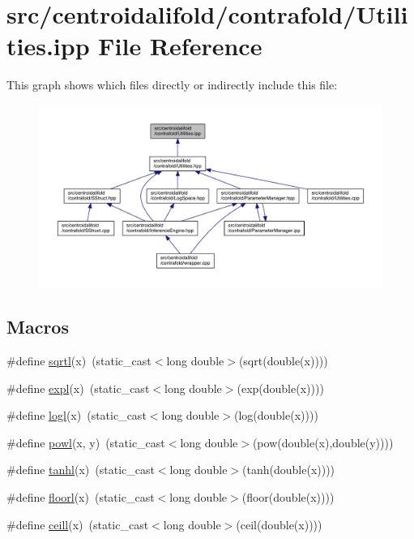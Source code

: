 \hypertarget{centroidalifold_2contrafold_2_utilities_8ipp}{\section{src/centroidalifold/contrafold/\+Utilities.ipp File Reference}
\label{centroidalifold_2contrafold_2_utilities_8ipp}
}
This graph shows which files directly or indirectly include this file\+:
\nopagebreak
\begin{figure}[H]
\begin{center}
\leavevmode
\includegraphics[width=350pt]{centroidalifold_2contrafold_2_utilities_8ipp__dep__incl}
\end{center}
\end{figure}
\subsection*{Macros}
\begin{DoxyCompactItemize}
\item 
\#define \hyperlink{centroidalifold_2contrafold_2_utilities_8ipp_adec5708ea4f27b718663e2a57e73303a}{sqrtl}(x)~(static\+\_\+cast$<$long double$>$(sqrt(double(x))))
\item 
\#define \hyperlink{centroidalifold_2contrafold_2_utilities_8ipp_a3262d247d0e746116959ee487aed42e1}{expl}(x)~(static\+\_\+cast$<$long double$>$(exp(double(x))))
\item 
\#define \hyperlink{centroidalifold_2contrafold_2_utilities_8ipp_af30ed28c10eaaab05f92d1043d458741}{logl}(x)~(static\+\_\+cast$<$long double$>$(log(double(x))))
\item 
\#define \hyperlink{centroidalifold_2contrafold_2_utilities_8ipp_a38ce40625edb986ea847a15a34615cc1}{powl}(x, y)~(static\+\_\+cast$<$long double$>$(pow(double(x),double(y))))
\item 
\#define \hyperlink{centroidalifold_2contrafold_2_utilities_8ipp_a99028516a5b84b8232290731299c72cd}{tanhl}(x)~(static\+\_\+cast$<$long double$>$(tanh(double(x))))
\item 
\#define \hyperlink{centroidalifold_2contrafold_2_utilities_8ipp_a0ea134b0841e1599acca1a6798ef4607}{floorl}(x)~(static\+\_\+cast$<$long double$>$(floor(double(x))))
\item 
\#define \hyperlink{centroidalifold_2contrafold_2_utilities_8ipp_a8bd1d8e6a787be7c41651531bb76e2f8}{ceill}(x)~(static\+\_\+cast$<$long double$>$(ceil(double(x))))
\end{DoxyCompactItemize}
